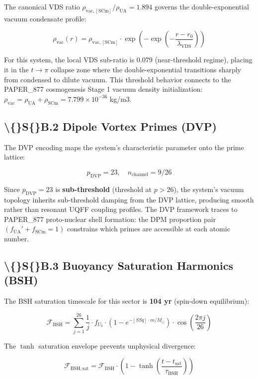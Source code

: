 \documentclass[11pt]{article}
\begin{document}
The canonical VDS ratio $\rho_{\mathrm{vac,[SCm]}} / \rho_{\mathrm{UA}} = 1.894$ governs the double-exponential vacuum condensate profile:

$$\rho_{\mathrm{vac}}(r) = \rho_{\mathrm{vac,[SCm]}} \cdot \exp\!\left(-\exp\!\left(-\frac{r - r_0}{\lambda_{\mathrm{VDS}}}\right)\right)$$

For this system, the local VDS sub-ratio is $0.079$ (near-threshold regime), placing it in the $t \to \pi$ collapse zone where the double-exponential transitions sharply from condensed to dilute vacuum. This threshold behavior connects to the PAPER\_877 cosmogenesis Stage 1 vacuum density initialization: $\rho_{\mathrm{vac}} = \rho_{\mathrm{UA}} + \rho_{\mathrm{SCm}} = 7.799 \times 10^{-36}$ kg/m3.

\subsection*{\textbackslash\{\}S\{\}B.2 Dipole Vortex Primes (DVP)}

The DVP encoding maps the system's characteristic parameter onto the prime lattice:

$$p_{\mathrm{DVP}} = 23, \quad n_{\mathrm{channel}} = 9/26$$

Since $p_{\mathrm{DVP}} = 23$ is \textbf{sub-threshold} (threshold at $p > 26$), the system's vacuum topology inherits sub-threshold damping from the DVP lattice, producing smooth rather than resonant UQFF coupling profiles. The DVP framework traces to PAPER\_877 proto-nuclear shell formation: the DPM proportion pair $(f_{\mathrm{UA}}' + f_{\mathrm{SCm}} = 1)$ constrains which primes are accessible at each atomic number.

\subsection*{\textbackslash\{\}S\{\}B.3 Buoyancy Saturation Harmonics (BSH)}

The BSH saturation timescale for this sector is \textbf{104 yr} (spin-down equilibrium):

$$\mathcal{F}_{\mathrm{BSH}} = \sum_{j=1}^{26} \frac{1}{j} \cdot f_U_b \cdot \left(1 - e^{-[SSq] \cdot m/M_\odot}\right) \cdot \cos\!\left(\frac{2\pi j}{26}\right)$$

The $\tanh$ saturation envelope prevents unphysical divergence:

$$\mathcal{F}_{\mathrm{BSH,sat}} = \mathcal{F}_{\mathrm{BSH}} \cdot \left(1 - \tanh\!\left(\frac{t - t_{\mathrm{sat}}}{\tau_{\mathrm{BSH}}}\right)\right)$$
\end{document}
